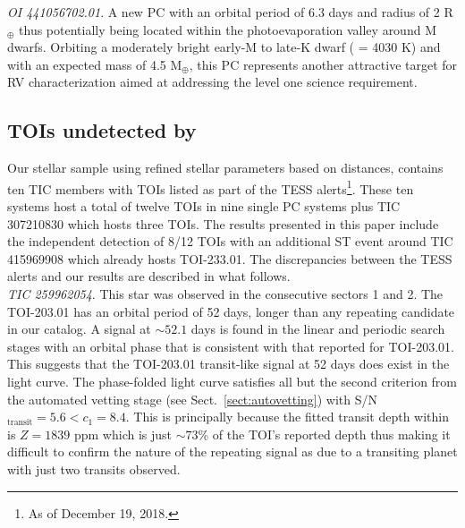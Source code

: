 \emph{OI 441056702.01}. A new PC with an orbital period of 6.3 days and radius of 2 R$_{\oplus}$
thus potentially being located within the photoevaporation valley around M dwarfs. Orbiting a moderately bright
early-M to late-K dwarf (\teff{} = 4030 K) and with an expected mass of 4.5 M$_{\oplus}$, this PC
represents another attractive target for RV characterization aimed at addressing the \tess{} level
one science requirement. 


\subsection{TOIs undetected by \pipeline{}} \label{sect:undet}
Our stellar sample using refined stellar parameters based on \gaia{} distances,
contains ten TIC members with TOIs listed as part of the TESS alerts\footnote{As of December 19, 2018.}.
These ten systems host a total of twelve TOIs in nine single PC systems
plus TIC 307210830 which hosts three TOIs. The \pipeline{} results presented in this paper
include the independent detection of 8/12 TOIs with an additional ST event around TIC 415969908 which
already hosts TOI-233.01. The discrepancies between the TESS alerts and our \pipeline{} results
are described in what follows. \\

\emph{TIC 259962054}. This star was observed in the consecutive \tess{} sectors 1 and 2.
The TOI-203.01 has an orbital period of 52 days, longer than any repeating
candidate in our catalog. A signal at $\sim 52.1$ days is found in the \pipeline{} linear and
periodic search stages with an orbital phase that is consistent with that reported for TOI-203.01.
This suggests that the TOI-203.01 transit-like signal at 52 days does exist in the light curve.
The phase-folded light curve satisfies all but the second criterion from the automated vetting
stage (see Sect.~\ref{sect:autovetting}) with S/N$_{\text{transit}}=5.6<c_1=8.4$. This is principally
because the fitted transit depth within \pipeline{} is $Z=1839$ ppm  which is just
$\sim 73$\% of the TOI's reported depth thus making it difficult to confirm the nature of the
repeating signal as due to a transiting planet with just two transits observed. \\


